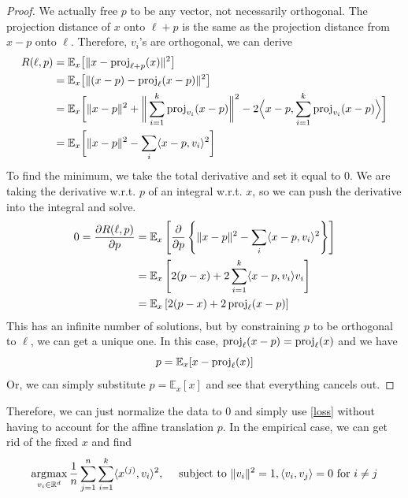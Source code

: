   \begin{proof}
    We actually free $p$ to be any vector, not necessarily orthogonal. The projection distance of $x$ onto $\ell + p$ is the same as the projection distance from $x-p$ onto $\ell$. Therefore, $v_i$'s are orthogonal, we can derive
    \begin{align}
      R(\ell, p) & = \mathbb{E}_x \big[ \| x - \operatorname{proj}_{\ell + p} (x) \|^2 \big] \\ 
                 & = \mathbb{E}_x \big[ \| (x - p) - \operatorname{proj}_\ell (x - p) \|^2 \big] \\
                 & = \mathbb{E}_x \bigg[ \|x - p\|^2 + \bigg\| \sum_{i=1}^k \operatorname{proj}_{v_i} (x - p) \bigg\|^2 - 2 \Big\langle x - p, \sum_{i=1}^k \operatorname{proj}_{v_i} (x - p) \Big\rangle \bigg] \\ 
                 & = \mathbb{E}_x \bigg[ \|x - p\|^2 - \sum_i \langle x - p, v_i \rangle^2 \bigg] 
    \end{align}
    To find the minimum, we take the total derivative and set it equal to $0$. We are taking the derivative w.r.t. $p$ of an integral w.r.t. $x$, so we can push the derivative into the integral and solve. 
    \begin{align}
      0 = \frac{\partial R(\ell, p)}{\partial p} 
        &= \mathbb{E}_x \left[ \frac{\partial}{\partial p} \left\{ \|x - p\|^2 - \sum_i \langle x - p, v_i \rangle^2  \right\} \right] \\
        &= \mathbb{E}_x \left[ 2(p - x) + 2 \sum_{i=1}^k \langle x - p, v_i \rangle v_i \right]  \\ 
        &= \mathbb{E}_x \left[ 2(p - x) + 2 \operatorname{proj}_{\ell} (x - p) \right]
    \end{align} 
    This has an infinite number of solutions, but by constraining $p$ to be orthogonal to $\ell$, we can get a unique one. In this case, $\operatorname{proj}_\ell (x - p) = \operatorname{proj}_\ell (x)$ and we have 
    \begin{equation}
      p = \mathbb{E}_{x} [x - \operatorname{proj}_\ell (x)]
    \end{equation}
    Or, we can simply substitute $p = \mathbb{E}_x [x]$ and see that everything cancels out. 
  \end{proof}

  Therefore, we can just normalize the data to $0$ and simply use \ref{loss} without having to account for the affine translation $p$. In the empirical case, we can get rid of the fixed $x$ and find 
  \begin{equation}
    \operatorname*{\arg\!\max}_{v_i \in \mathbb{R}^d} \frac{1}{n} \sum_{j=1}^n \sum_{i=1}^k \langle x^{(j)}, v_i \rangle^2, \quad \text{ subject to } \|v_i\|^2 = 1, \langle v_i, v_j \rangle = 0 \text{ for } i \neq j
  \end{equation} 

